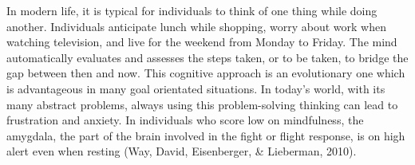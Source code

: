 In modern life, it is typical for individuals to think of one thing while doing another. Individuals anticipate lunch while shopping, worry about work when watching television, and live for the weekend from Monday to Friday. The mind automatically evaluates and assesses the steps taken, or to be taken, to bridge the gap between then and now. This cognitive approach is an evolutionary one which is advantageous in many goal orientated situations. In today’s world, with its many abstract problems, always using this problem-solving thinking can lead to frustration and anxiety. In individuals who score low on mindfulness, the amygdala, the part of the brain involved in the fight or flight response, is on high alert even when resting (Way, David, Eisenberger, & Lieberman, 2010).